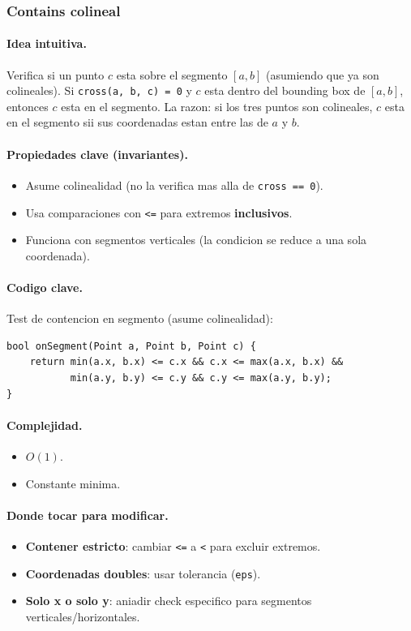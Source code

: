 ﻿\subsubsection{Contains colineal}

\paragraph{Idea intuitiva.}
Verifica si un punto $c$ esta sobre el segmento $[a, b]$ (asumiendo que ya son colineales). Si \texttt{cross(a, b, c) = 0} y $c$ esta dentro del bounding box de $[a, b]$, entonces $c$ esta en el segmento. La razon: si los tres puntos son colineales, $c$ esta en el segmento sii sus coordenadas estan entre las de $a$ y $b$.

\paragraph{Propiedades clave (invariantes).}
\begin{itemize}\setlength\itemsep{0pt}
	\item Asume colinealidad (no la verifica mas alla de \texttt{cross == 0}).
	\item Usa comparaciones con \texttt{<=} para extremos \textbf{inclusivos}.
	\item Funciona con segmentos verticales (la condicion se reduce a una sola coordenada).
\end{itemize}

\paragraph{Codigo clave.}
Test de contencion en segmento (asume colinealidad):
\begin{verbatim}
bool onSegment(Point a, Point b, Point c) {
    return min(a.x, b.x) <= c.x && c.x <= max(a.x, b.x) &&
           min(a.y, b.y) <= c.y && c.y <= max(a.y, b.y);
}
\end{verbatim}

\paragraph{Complejidad.}
\begin{itemize}\setlength\itemsep{0pt}
	\item $O(1)$.
	\item Constante minima.
\end{itemize}

\paragraph{Donde tocar para modificar.}
\begin{itemize}\setlength\itemsep{0pt}
	\item \textbf{Contener estricto}: cambiar \texttt{<=} a \texttt{<} para excluir extremos.
	\item \textbf{Coordenadas doubles}: usar tolerancia (\texttt{eps}).
	\item \textbf{Solo x o solo y}: aniadir check especifico para segmentos verticales/horizontales.
\end{itemize}

